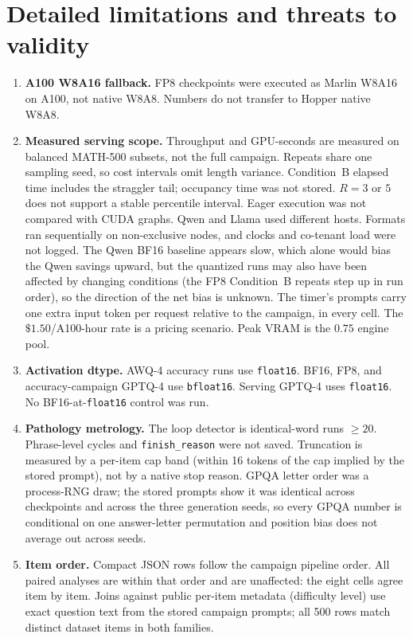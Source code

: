 \documentclass[11pt,a4paper]{article}
\begin{document}
\FloatBarrier
\section{Detailed limitations and threats to validity}
\label{app:limitations}
\begin{enumerate}
    \item \textbf{A100 W8A16 fallback.} FP8 checkpoints were executed as Marlin W8A16 on A100, not native W8A8. Numbers do not transfer to Hopper native W8A8.
    \item \textbf{Measured serving scope.} Throughput and GPU-seconds are measured on balanced MATH-500 subsets, not the full campaign. Repeats share one sampling seed, so cost intervals omit length variance. Condition~B elapsed time includes the straggler tail; occupancy time was not stored. $R=3$ or $5$ does not support a stable percentile interval. Eager execution was not compared with CUDA graphs. Qwen and Llama used different hosts. Formats ran sequentially on non-exclusive nodes, and clocks and co-tenant load were not logged. The Qwen BF16 baseline appears slow, which alone would bias the Qwen savings upward, but the quantized runs may also have been affected by changing conditions (the FP8 Condition~B repeats step up in run order), so the direction of the net bias is unknown. The timer's prompts carry one extra input token per request relative to the campaign, in every cell. The $\$1.50$/A100-hour rate is a pricing scenario. Peak VRAM is the $0.75$ engine pool.
    \item \textbf{Activation dtype.} AWQ-4 accuracy runs use \texttt{float16}. BF16, FP8, and accuracy-campaign GPTQ-4 use \texttt{bfloat16}. Serving GPTQ-4 uses \texttt{float16}. No BF16-at-\texttt{float16} control was run.
    \item \textbf{Pathology metrology.} The loop detector is identical-word runs $\ge 20$. Phrase-level cycles and \texttt{finish\_reason} were not saved. Truncation is measured by a per-item cap band (within 16 tokens of the cap implied by the stored prompt), not by a native stop reason. GPQA letter order was a process-RNG draw; the stored prompts show it was identical across checkpoints and across the three generation seeds, so every GPQA number is conditional on one answer-letter permutation and position bias does not average out across seeds.
    \item \textbf{Item order.} Compact JSON rows follow the campaign pipeline order. All paired analyses are within that order and are unaffected: the eight cells agree item by item. Joins against public per-item metadata (difficulty level) use exact question text from the stored campaign prompts; all 500 rows match distinct dataset items in both families.

\end{enumerate}
\end{document}
